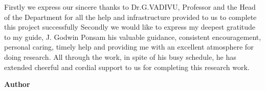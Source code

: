 \documentclass[BTech]{srmuthesis}
\begin{document}
\pagebreak
\acknowledgements
Firstly we express our sincere thanks to Dr.G.VADIVU, Professor and the Head of the Department for all the help and infrastructure provided to us to complete this project successfully 
Secondly we would like to express my deepest gratitude to my guide, J. Godwin Ponsam his valuable guidance, consistent encouragement, personal caring, timely help and providing me with an excellent atmosphere for doing research. All through the work, in spite of his busy schedule, he has extended cheerful and cordial support to us for completing this research work.\\



\begin{flushright}
{\bf Author}
\end{flushright}

\begin{singlespace}
\tableofcontents
\thispagestyle{empty}

\listoffigures
{}
\end{singlespace}



\end{document}
